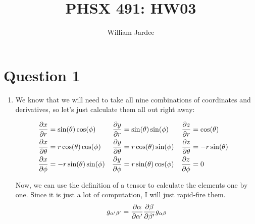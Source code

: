 \documentclass[11pt]{article}
\begin{document}
\title{PHSX 491: HW03}
\author{William Jardee}
\maketitle

\section*{Question 1}
\begin{enumerate}[label=\alph*)]
\item
We know that we will need to take all nine combinations of coordinates and derivatives, so let's just calculate them all out right away:

\begin{align*}
\pdv{x}{r} & = \sin(\theta)\cos(\phi) & \pdv{y}{r} & = \sin(\theta)\sin(\phi) & \pdv{z}{r} & = \cos(\theta)&\\
\pdv{x}{\theta} & = r \cos(\theta)\cos(\phi) & \pdv{y}{\theta} & = r\cos(\theta)\sin(\phi) & \pdv{z}{\theta} & = -r\sin(\theta)&\\
\pdv{x}{\phi} &= -r\sin(\theta)\sin(\phi) & \pdv{y}{\phi} &= r \sin(\theta)\cos(\phi) & \pdv{z}{\phi} &= 0&\\
\end{align*}

Now, we can use the definition of a tensor to calculate the elements one by one. Since it is just a lot of computation, I will just rapid-fire them. 
\begin{align*}
g_{\alpha^\prime \beta^\prime} = \pdv{\alpha}{\alpha^\prime}\pdv{\beta}{\beta^\prime}g_{\alpha\beta}
\end{align*}


\end{enumerate}
\end{document}

